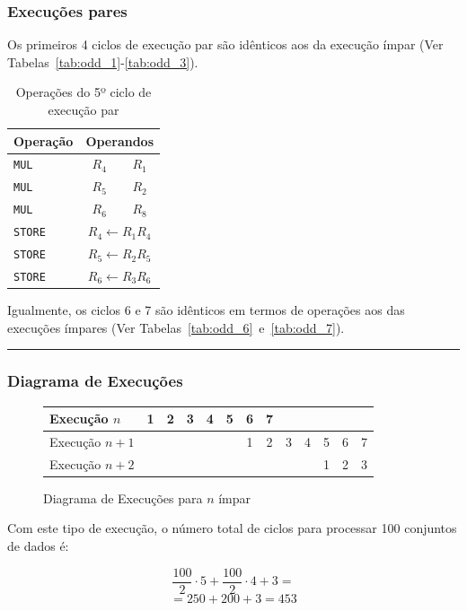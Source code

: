 \begin{multicols}{2}
	\subsubsection{Execuções pares}

	Os primeiros 4 ciclos de execução par são idênticos aos da execução ímpar (Ver Tabelas~\ref{tab:odd_1}-\ref{tab:odd_3}).

	\begin{table}[H]
		\centering
		\begin{tabular}{l|c|c}
			Operação & \multicolumn{2}{c}{Operandos} \\
			\hline
			\texttt{MUL} & $R_4$ & $R_1$ \\
			\texttt{MUL} & $R_5$ & $R_2$ \\
			\texttt{MUL} & $R_6$ & $R_8$ \\
			\hline
			\texttt{STORE} & \multicolumn{2}{c}{$R_4\leftarrow R_1R_4$} \\
			\texttt{STORE} & \multicolumn{2}{c}{$R_5\leftarrow R_2R_5$} \\
			\texttt{STORE} & \multicolumn{2}{c}{$R_6\leftarrow R_3R_6$} \\
		\end{tabular}
		\caption{Operações do 5º ciclo de execução par}
		\label{tab:even_5}
	\end{table}

	Igualmente, os ciclos 6 e 7 são idênticos em termos de operações aos das execuções ímpares (Ver Tabelas~\ref{tab:odd_6}~e~\ref{tab:odd_7}).

\end{multicols}
\noindent\rule{\linewidth}{0.4pt}


\subsubsection{Diagrama de Execuções}

\begin{figure}[H]
	\centering
	\begin{tabular}{|l||c|c|c|c|c|c|c|c|c|c|c|c|}
		\hline
		Execução $n$ & 1 & 2 & 3 & 4 & 5 & 6 & 7 &&&&&\\
		\hline
		Execução $n+1$ &&&&&& 1 & 2 & 3 & 4 & 5 & 6 & 7 \\
		\hline
		Execução $n+2$ &&&&&&&&&& 1 & 2 & 3 \\
		\hline
	\end{tabular}
	\caption{Diagrama de Execuções para $n$ ímpar}
	\label{fig:datapath_max_throughput}
\end{figure}

Com este tipo de execução, o número total de ciclos para processar 100 conjuntos de dados é:

\[ \frac{100}{2} \cdot 5 + \frac{100}{2} \cdot 4 + 3 = \]
\[= 250 + 200 + 3 = 453\]